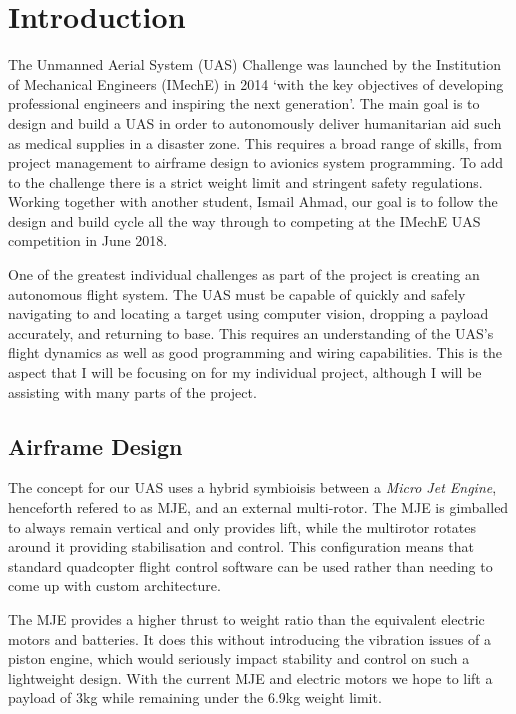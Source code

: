 \documentclass[11pt]{article}
\begin{document}
\section{Introduction}
The Unmanned Aerial System (UAS) Challenge was launched by the Institution of Mechanical Engineers (IMechE) in 2014 `with the key objectives of developing professional engineers and inspiring the next generation'\cite{IMechE_about_uas}. The main goal is to design and build a UAS in order to autonomously deliver humanitarian aid such as medical supplies in a disaster zone. This requires a broad range of skills, from project management to airframe design to avionics system programming. To add to the challenge there is a strict weight limit and stringent safety regulations. Working together with another student, Ismail Ahmad, our goal is to follow the design and build cycle all the way through to competing at the IMechE UAS competition in June 2018.

One of the greatest individual challenges as part of the project is creating an autonomous flight system. The UAS must be capable of quickly and safely navigating to and locating a target using computer vision, dropping a payload accurately, and returning to base. This requires an understanding of the UAS’s flight dynamics as well as good programming and wiring capabilities. This is the aspect that I will be focusing on for my individual project, although I will be assisting with many parts of the project.



\subsection{Airframe Design}
The concept for our UAS uses a hybrid symbioisis between a \emph{Micro Jet Engine}, henceforth refered to as MJE, and an external multi-rotor. The MJE is gimballed to always remain vertical and only provides lift, while the multirotor rotates around it providing stabilisation and control. This configuration means that standard quadcopter flight control software can be used rather than needing to come up with custom architecture.

The MJE provides a higher thrust to weight ratio than the equivalent electric motors and batteries. It does this without introducing the vibration issues of a piston engine, which would seriously impact stability and control on such a lightweight design. With the current MJE and electric motors we hope to lift a payload of 3kg while remaining under the 6.9kg weight limit.
\end{document}
